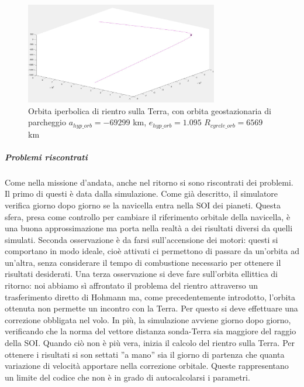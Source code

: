 \documentclass[a4paper]{article}
\begin{document}
\begin{figure}[h]
\includegraphics[width=0.75\textwidth]{orbita_finaleT.png}
\centering
\caption{Orbita iperbolica di rientro sulla Terra, con orbita geostazionaria di parcheggio \newline $a_{hyp\_orb} = -69299$ km, $e_{hyp\_orb} = 1.095$ \newline $R_{cyrcle\_orb} = 6569$ km}
\end{figure}
\newpage
\subparagraph{Problemi riscontrati\newline}
Come nella missione d'andata, anche nel ritorno si sono riscontrati dei problemi. \newline Il primo di questi è data dalla simulazione. Come già descritto, il simulatore verifica giorno dopo giorno se la navicella entra nella SOI dei pianeti. Questa sfera, presa come controllo per cambiare il riferimento orbitale della navicella, è una buona approssimazione ma porta nella realtà a dei risultati diversi da quelli simulati. \newline Seconda osservazione è da farsi sull'accensione dei motori: questi si comportano in modo ideale, cioè attivati ci permettono di passare da un'orbita ad un'altra, senza considerare il tempo di combustione necessario per ottenere il risultati desiderati. \newline Una terza osservazione si deve fare sull'orbita ellittica di ritorno: noi abbiamo sì affrontato il problema del rientro attraverso un trasferimento diretto di Hohmann ma, come precedentemente introdotto, l'orbita ottenuta non permette un incontro con la Terra. Per questo si deve effettuare una correzione obbligata nel volo. In più, la simulazione avviene giorno dopo giorno, verificando che la norma del vettore distanza sonda-Terra sia maggiore del raggio della SOI. Quando ciò non è più vera, inizia il calcolo del rientro sulla Terra. Per ottenere i risultati si son settati ''a mano'' sia il giorno di partenza che quanta variazione di velocità apportare nella correzione orbitale. Queste rappresentano un limite del codice che non è in grado di autocalcolarsi i parametri. 
\end{document}
